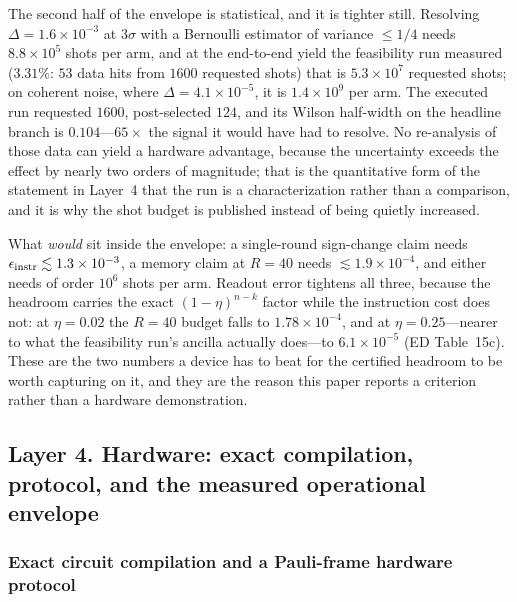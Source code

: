 \documentclass[aps,prxquantum,reprint,superscriptaddress]{revtex4-2}
\begin{document}
The second half of the envelope is statistical, and it is tighter still. Resolving
$\Delta=1.6\times10^{-3}$ at $3\sigma$ with a Bernoulli estimator of variance
$\le1/4$ needs $8.8\times10^{5}$ shots per arm, and at the end-to-end yield the
feasibility run measured ($3.31\%$: $53$ data hits from $1600$ requested shots)
that is $5.3\times10^{7}$ requested shots; on coherent noise, where
$\Delta=4.1\times10^{-5}$, it is $1.4\times10^{9}$ per arm. The executed run
requested $1600$, post-selected $124$, and its Wilson half-width on the headline
branch is $0.104$---$65\times$ the signal it would have had to resolve. No
re-analysis of those data can yield a hardware advantage, because the uncertainty
exceeds the effect by nearly two orders of magnitude; that is the quantitative form
of the statement in Layer~4 that the run is a characterization rather than a
comparison, and it is why the shot budget is published instead of being quietly
increased.

What \emph{would} sit inside the envelope: a single-round sign-change claim needs
$\epsilon_{\rm instr}\lesssim1.3\times10^{-3}$, a memory claim at $R=40$ needs
$\lesssim1.9\times10^{-4}$, and either needs of order $10^{6}$ shots per arm.
Readout error tightens all three, because the headroom carries the exact
$(1-\eta)^{n-k}$ factor while the instruction cost does not: at $\eta=0.02$ the
$R=40$ budget falls to $1.78\times10^{-4}$, and at $\eta=0.25$---nearer to what the
feasibility run's ancilla actually does---to $6.1\times10^{-5}$ (ED Table~15c).
These are the two numbers a device has to beat for the certified headroom to be
worth capturing on it, and they are the reason this paper reports a criterion rather
than a hardware demonstration.

\subsection*{Layer 4. Hardware: exact compilation, protocol, and the measured
operational envelope}

\subsubsection*{Exact circuit compilation and a Pauli-frame hardware protocol}
\end{document}
